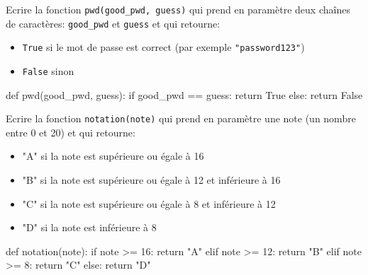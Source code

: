 \documentclass[11pt, a4paper]{report}
\begin{document}
    \begin{minipage}{0.48\linewidth}
        \begin{exercice_cours}

            Ecrire la fonction \verb|pwd(good_pwd, guess)| qui prend en paramètre deux chaînes de caractères: \texttt{good\_pwd} et \texttt{guess} et qui retourne:
    \begin{itemize}
        \item \texttt{True} si le mot de passe est correct (par exemple \texttt{"password123"})
        \item \texttt{False} sinon 
    \end{itemize}
    \end{exercice_cours}

    \end{minipage}\hfill
    \begin{minipage}{0.48\linewidth}
\begin{blocvisible}[height=3.5]
    \begin{CodePythontexAlt}[TaillePolice=\large, Largeur=1\linewidth,Centre,Lignes=true,PremLigne=1]{}
def pwd(good_pwd, guess):
    if good_pwd == guess:
        return True
    else:
        return False    
    \end{CodePythontexAlt}
\end{blocvisible}

    \end{minipage}

        
    \begin{minipage}{0.48\linewidth}
           \begin{exercice_cours}

            Ecrire la fonction \verb|notation(note)| qui prend en paramètre une note (un nombre entre 0 et 20) et qui retourne:
    \begin{itemize}
        \item "A" si la note est supérieure ou égale à 16
        \item "B" si la note est supérieure ou égale à 12 et inférieure à 16
        \item "C" si la note est supérieure ou égale à 8 et inférieure à 12
        \item "D" si la note est inférieure à 8
    \end{itemize}
    \end{exercice_cours}

    \end{minipage}\hfill
    \begin{minipage}{0.48\linewidth}
\begin{blocvisible}[height=5.5]
    \begin{CodePythontexAlt}[TaillePolice=\large, Largeur=1\linewidth,Centre,Lignes=true,PremLigne=1]{}
def notation(note):
    if note >= 16:
        return "A"
    elif note >= 12:
        return "B"
    elif note >= 8:
        return "C"
    else:
        return "D"
    \end{CodePythontexAlt}
\end{blocvisible}

    \end{minipage}
        
\end{document}
